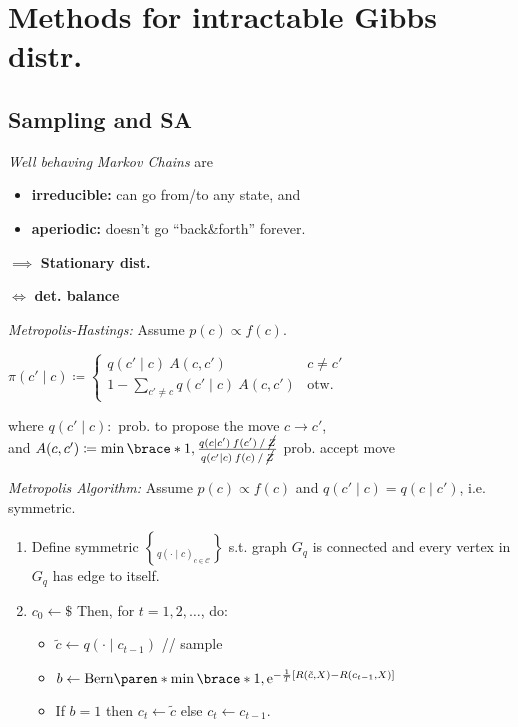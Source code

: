 \section{Methods for intractable Gibbs distr.}


\subsection{Sampling and SA}

\textit{Well behaving} \emph{Markov Chains} are
\begin{itemize}
    \item \textbf{irreducible:} can go from/to any state, and
    \item \textbf{aperiodic:} doesn't go ``back\&forth'' forever.
\end{itemize}

$\implies$ \textbf{Stationary dist.} 

$\iff$ \textbf{det. balance} 

\emph{Metropolis-Hastings:}
Assume $p(c) \propto f(c)$.

$\pi(c'\mid c) \coloneqq
\begin{cases}
    q(c'\mid c) \: A(c,c') & c\neq c'\\
    1 - \sum_{c'\neq c} q(c'\mid c) \: A(c,c') & \text{otw.}
\end{cases}$

where\enskip
$q(c'\mid c) :$ prob. to propose the move $c \to c'$,\\
and\enskip
$A(c,c') \coloneqq \min\brace*{ 1, \frac{q(c\mid c') \: f(c') \: / \: \cancel{Z}}{q(c'\mid c) \: f(c) \: / \: \cancel{Z}} }$ prob. accept move

\emph{Metropolis Algorithm:}\enspace
Assume $p(c) \propto f(c)$ and $q(c'\mid c) = q(c\mid c')$, i.e. symmetric.

\begin{highlightbox}
\begin{enumerate}
    \item Define symmetric $\brace{ q(\cdot\mid c) }_{c\in\mathcal C}$ s.t. graph $G_q$ is connected and every vertex in $G_q$ has edge to itself.
    \item $c_0 \leftarrow \$$
        \qquad Then, for $t=1,2,\ldots$, do:
    \begin{itemize}
        \item $\tilde c \leftarrow q(\cdot\mid c_{t-1})$ \quad // sample
        \item $b \leftarrow \mathrm{Bern}\paren*{\min\brace*{ 1, \eu^{-\frac1T [R(\tilde c, X) - R(c_{t-1}, X)]} }}$ %
        \item If $b=1$ then $c_t \leftarrow \tilde c$ else $c_t \leftarrow c_{t-1}$.
    \end{itemize}
\end{enumerate}
\end{highlightbox}

